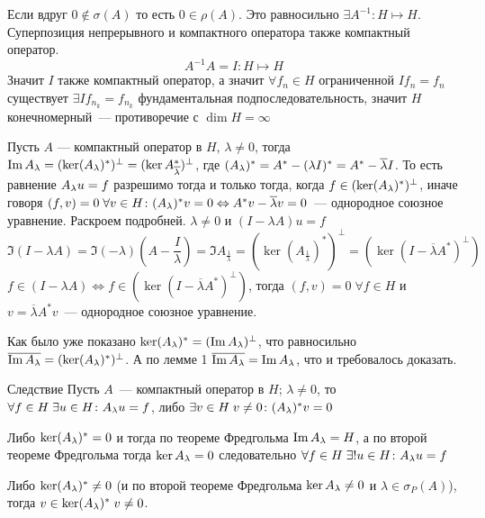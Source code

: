 \documentclass[14pt]{extarticle}
\begin{document}
\noindent Если вдруг $0 \notin \sigma(A)$ то есть $0 \in \rho(A)$.
Это равносильно $\exists A^{-1} : H \mapsto H$.
Суперпозиция непрерывного и компактного оператора также компактный оператор.
$$
A^{-1} A = I : H \mapsto H
$$
Значит $I$ также компактный оператор, а значит $\forall f_n \in H$ 
ограниченной $I f_n = f_n$ существует $\exists I f_{n_k} = f_{n_k}$ 
фундаментальная подпоследовательность, значит $H$ конечномерный~--- 
противоречие с $\dim H = \infty$
\begin{Theor}
    Пусть $A$ --- компактный оператор в $H$, $\lambda \ne 0$, тогда $\Im \Al =
    (\ker (\Al)^*)^\perp = (\ker A^*_{\overline{\lambda}})^\perp$,
    где $(\Al)^* = A^* - (\lambda I)^* = A^* - \overline{\lambda} I$.
    То есть равнение $\Al u = f$ разрешимо тогда и только тогда, когда
    $f \in (\ker(\Al)^*)^\perp$, иначе говоря $(f, v) = 0\; \forall v \in H
    \colon (\Al)^*v = 0 \Leftrightarrow A^*v - \overline{\lambda}v = 0$~--- 
    однородное союзное уравнение.
    Раскроем подробней.
    $\lambda \ne 0$ и $(I - \lambda A)u = f$
    $$
    \Im (I - \lambda A) = \Im (-\lambda)(A - \dfrac{I}{\lambda}) =
    \Im A_{\frac{1}{\lambda}} = (\ker(A_{\frac{1}{\lambda}})^*)^\perp = 
    (\ker(I - \overline{\lambda}A^*)^\perp)
    $$
    $f \in (I - \lambda A) \Leftrightarrow f \in (\ker(I - \overline{\lambda}
    A^*)^\perp)$, тогда $(f, v) = 0\; \forall f \in H$ и $v = 
    \overline{\lambda} A^*v$~--- однородное союзное уравнение.
\end{Theor}
\begin{Proof}
    Как было уже показано $\ker (\Al)^* = (\Im \Al)^\perp$, что равносильно
    $\overline{\Im \Al} = (\ker (\Al)^*)^\perp$.
    А по лемме 1 $\overline{\Im \Al} = \Im \Al$, что и требовалось доказать.
\end{Proof}
\begin{MathCl}{Следствие}
    Пусть $A$~--- компактный оператор в $H$; $\lambda \ne 0$, то $\forall f 
    \in H\;\exists u \in H\colon \Al u = f$, либо $\exists v \in H\; v \ne 0
    \colon (\Al)^* v = 0$
\end{MathCl}
\begin{Proof}
    Либо $\ker(\Al)^* = 0$ и тогда по теореме Фредгольма $\Im \Al = H$, а по
    второй теореме Фредгольма тогда $\ker \Al = 0$ следовательно $\forall f 
    \in H\;\exists!u \in H \colon \Al u = f$
    
    Либо $\ker(\Al)^* \ne 0$ (и по второй теореме Фредгольма $\ker \Al \ne 0$
    и $\lambda \in \sigma_P(A)$), тогда $v \in \ker (\Al)^*\; v \ne 0$.
\end{Proof}
\end{document}
